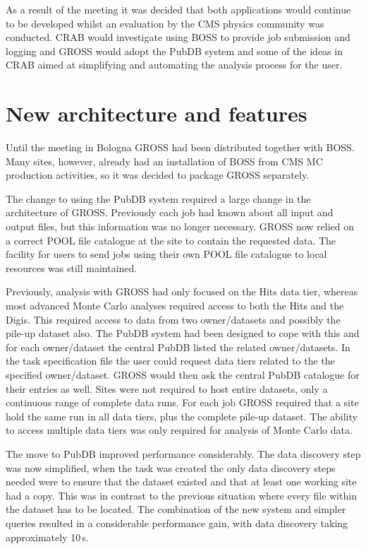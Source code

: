 As a result of the meeting it was decided that both applications would continue to be developed whilst an evaluation by the CMS physics community was conducted. CRAB would investigate using BOSS to provide job submission and logging and GROSS would adopt the PubDB system and some of the ideas in CRAB aimed at simplifying and automating the analysis process for the user.

\section{New architecture and features}
Until the meeting in Bologna GROSS had been distributed together with BOSS. Many sites, however, already had an installation of BOSS from CMS MC production activities, so it was decided to package GROSS separately.

The change to using the PubDB system required a large change in the architecture of GROSS. Previously each job had known about all input and output files, but this information was no longer necessary. GROSS now relied on a correct POOL file catalogue at the site to contain the requested data. The facility for users to send jobs using their own POOL file catalogue to local resources was still maintained.

Previously, analysis with GROSS had only focused on the Hits data tier, whereas most advanced Monte Carlo analyses required access to both the Hits and the Digis. This required access to data from two owner/datasets and possibly the pile-up dataset also. The PubDB system had been designed to cope with this and for each owner/dataset the central PubDB listed the related owner/datasets. In the task specification file the user could request data tiers related to the the specified owner/dataset. GROSS would then ask the central PubDB catalogue for their entries as well. Sites were not required to host entire datasets, only a continuous range of complete data runs. For each job GROSS required that a site hold the same run in all data tiers, plus the complete pile-up dataset. The ability to access multiple data tiers was only required for analysis of Monte Carlo data.

The move to PubDB improved performance considerably. The data discovery step was now simplified, when the task was created the only data discovery steps needed were to ensure that the dataset existed and that at least one working site had a copy. This was in contrast to the previous situation where every file within the dataset has to be located. The combination of the new system and simpler queries resulted in a considerable performance gain, with data discovery taking approximately 10\,s.


